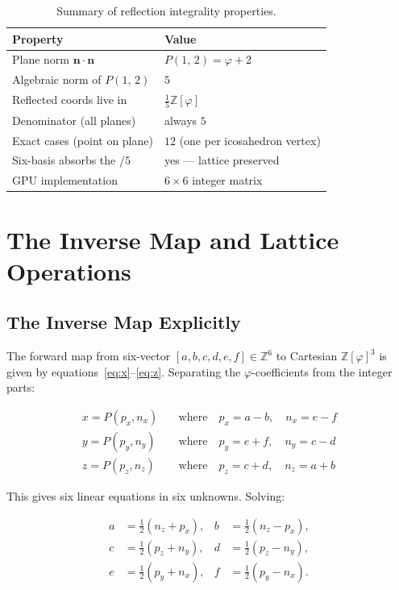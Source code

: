 \documentclass[12pt]{article}
\theoremstyle{definition}
\theoremstyle{remark}
\newcommand{\Z}{\mathbb{Z}}
\newcommand{\Zphi}{\mathbb{Z}[\varphi]}
\newcommand{\Phib}[2]{P(#1,\,#2)}
\begin{document}
\begin{table}[h]
\centering
\caption{Summary of reflection integrality properties.}
\label{tab:reflsummary}
\begin{tabular}{ll}
\toprule
Property & Value \\
\midrule
Plane norm $\mathbf{n}\cdot\mathbf{n}$ & $\Phib{1}{2} = \varphi+2$ \\
Algebraic norm of $\Phib{1}{2}$ & $5$ \\
Reflected coords live in & $\tfrac{1}{5}\Zphi$ \\
Denominator (all planes) & always $5$ \\
Exact cases (point on plane) & $12$ (one per icosahedron vertex) \\
Six-basis absorbs the $/5$ & yes — lattice preserved \\
GPU implementation & $6\times 6$ integer matrix \\
\bottomrule
\end{tabular}
\end{table}


\section{The Inverse Map and Lattice Operations}
\label{sec:inverse}

\subsection{The Inverse Map Explicitly}

The forward map from six-vector $[a,b,c,d,e,f]\in\Z^6$ to Cartesian
$\mathbb{Z}[\varphi]^3$ is given by equations~\eqref{eq:x}--\eqref{eq:z}.
Separating the $\varphi$-coefficients from the integer parts:

\begin{align}
  x = P(p_x, n_x) &\quad\text{where}\quad p_x = a-b,\quad n_x = e-f \label{eq:xpn}\\
  y = P(p_y, n_y) &\quad\text{where}\quad p_y = e+f,\quad n_y = c-d \label{eq:ypn}\\
  z = P(p_z, n_z) &\quad\text{where}\quad p_z = c+d,\quad n_z = a+b \label{eq:zpn}
\end{align}

This gives six linear equations in six unknowns.  Solving:

\begin{align}
  a &= \tfrac{1}{2}(n_z + p_x), &
  b &= \tfrac{1}{2}(n_z - p_x), \label{eq:ab}\\
  c &= \tfrac{1}{2}(p_z + n_y), &
  d &= \tfrac{1}{2}(p_z - n_y), \label{eq:cd}\\
  e &= \tfrac{1}{2}(p_y + n_x), &
  f &= \tfrac{1}{2}(p_y - n_x). \label{eq:ef}
\end{align}
\end{document}
